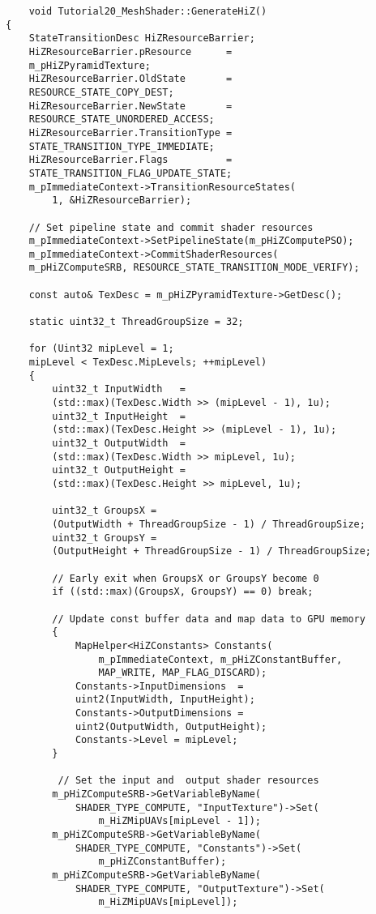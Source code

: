 \begin{lstlisting}
    void Tutorial20_MeshShader::GenerateHiZ()
{
    StateTransitionDesc HiZResourceBarrier;
    HiZResourceBarrier.pResource      = 
    m_pHiZPyramidTexture;
    HiZResourceBarrier.OldState       = 
    RESOURCE_STATE_COPY_DEST;
    HiZResourceBarrier.NewState       = 
    RESOURCE_STATE_UNORDERED_ACCESS;
    HiZResourceBarrier.TransitionType = 
    STATE_TRANSITION_TYPE_IMMEDIATE;
    HiZResourceBarrier.Flags          = 
    STATE_TRANSITION_FLAG_UPDATE_STATE;
    m_pImmediateContext->TransitionResourceStates(
        1, &HiZResourceBarrier);

    // Set pipeline state and commit shader resources
    m_pImmediateContext->SetPipelineState(m_pHiZComputePSO);
    m_pImmediateContext->CommitShaderResources(
    m_pHiZComputeSRB, RESOURCE_STATE_TRANSITION_MODE_VERIFY);

    const auto& TexDesc = m_pHiZPyramidTexture->GetDesc();

    static uint32_t ThreadGroupSize = 32;

    for (Uint32 mipLevel = 1; 
    mipLevel < TexDesc.MipLevels; ++mipLevel)
    {
        uint32_t InputWidth   = 
        (std::max)(TexDesc.Width >> (mipLevel - 1), 1u);
        uint32_t InputHeight  = 
        (std::max)(TexDesc.Height >> (mipLevel - 1), 1u);
        uint32_t OutputWidth  = 
        (std::max)(TexDesc.Width >> mipLevel, 1u);
        uint32_t OutputHeight = 
        (std::max)(TexDesc.Height >> mipLevel, 1u);

        uint32_t GroupsX = 
        (OutputWidth + ThreadGroupSize - 1) / ThreadGroupSize;
        uint32_t GroupsY = 
        (OutputHeight + ThreadGroupSize - 1) / ThreadGroupSize;
        
        // Early exit when GroupsX or GroupsY become 0
        if ((std::max)(GroupsX, GroupsY) == 0) break;

        // Update const buffer data and map data to GPU memory
        {
            MapHelper<HiZConstants> Constants(
                m_pImmediateContext, m_pHiZConstantBuffer, 
                MAP_WRITE, MAP_FLAG_DISCARD);
            Constants->InputDimensions  = 
            uint2(InputWidth, InputHeight);
            Constants->OutputDimensions = 
            uint2(OutputWidth, OutputHeight);
            Constants->Level = mipLevel;
        }
        
         // Set the input and  output shader resources
        m_pHiZComputeSRB->GetVariableByName(
            SHADER_TYPE_COMPUTE, "InputTexture")->Set(
                m_HiZMipUAVs[mipLevel - 1]);
        m_pHiZComputeSRB->GetVariableByName(
            SHADER_TYPE_COMPUTE, "Constants")->Set(
                m_pHiZConstantBuffer);
        m_pHiZComputeSRB->GetVariableByName(
            SHADER_TYPE_COMPUTE, "OutputTexture")->Set(
                m_HiZMipUAVs[mipLevel]);


\end{lstlisting}
